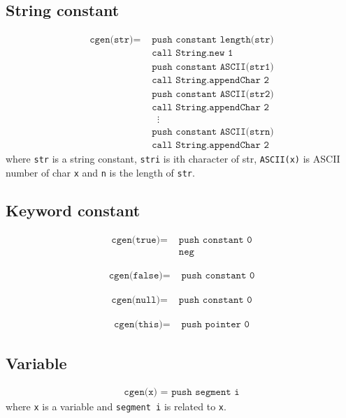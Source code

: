 \documentclass[a4paper]{book}
\begin{document}
\subsection*{String constant}
\begin{align*}
    \texttt{cgen(str)} =
    & \texttt{ push constant length(str)} \\
    & \texttt{ call String.new 1 } \\
    & \texttt{ push constant ASCII(str1)} \\
    & \texttt{ call String.appendChar 2} \\
    & \texttt{ push constant ASCII(str2)} \\
    & \texttt{ call String.appendChar 2} \\
    & ~ ~ ~ ~ \vdots \\
    & \texttt{ push constant ASCII(strn)} \\
    & \texttt{ call String.appendChar 2}
\end{align*}
where \texttt{str} is a string constant, \texttt{stri} is ith character of str, \texttt{ASCII(x)} is ASCII number of char \texttt{x} and \texttt{n} is the length of \texttt{str}.


\subsection*{Keyword constant}
\begin{align*}
    \texttt{cgen(true)} = & \texttt{ push constant 0} \\
    & \texttt{ neg }
\end{align*}

\begin{align*}
    \texttt{cgen(false)} = & \texttt{ push constant 0}
\end{align*}

\begin{align*}
    \texttt{cgen(null)} = & \texttt{ push constant 0}
\end{align*}

\begin{align*}
    \texttt{cgen(this)} = & \texttt{ push pointer 0}
\end{align*}


\subsection*{Variable}
\begin{align*}
    \texttt{cgen(x) = push segment i}
\end{align*}
where \texttt{x} is a variable and \colorbox{bl}{\texttt{segment i}} is related to \texttt{x}.
\end{document}
